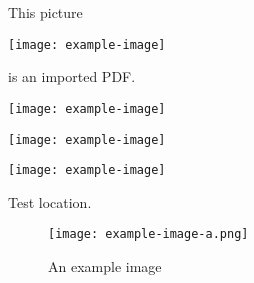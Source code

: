 \documentclass{article}
\begin{document}
	This picture
	\begin{center}
		\texttt{[image: example-image]}
	\end{center}
	is an imported PDF.
	
	\begin{center}
		\texttt{[image: example-image]}
	\end{center}
	
	\begin{center}
		\texttt{[image: example-image]}
	\end{center}
	
	
	\begin{center}
		\texttt{[image: example-image]}
	\end{center}
	
	\lipsum[1-4] %
	
	Test location.
	\begin{figure}[ht]
		\centering
		\texttt{[image: example-image-a.png]}
		\caption{An example image}
	\end{figure}
	
	\lipsum[6-10] %
	
	
\end{document}
